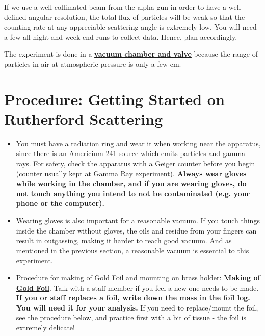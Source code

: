 \documentclass{../lab}
\begin{document}
If we use a well collimated beam from the alpha-gun in order to have a well defined angular resolution, the total flux of \textalpha{} particles will be weak so that the counting rate at any appreciable scattering angle is extremely low. You will need a few all-night and week-end runs to collect data. Hence, plan accordingly.

The experiment is done in a \href{https://berkeley-physics111b.github.io/assets/pdf/oldwebsitestructure/images/RUT\_Chamber.jpg}{\textbf{vacuum chamber and valve}} because the range of \textalpha{} particles in air at atmospheric pressure is only a few cm.

\section{Procedure: Getting Started on Rutherford Scattering}

\begin{itemize}
    \item You must have a radiation ring and wear it when working near the apparatus, since there is an Americium-241 source which emits \textalpha{} particles and gamma rays. For safety, check the apparatus with a Geiger counter before you begin (counter usually kept at Gamma Ray experiment). \textbf{Always wear gloves while working in the chamber, and if you are wearing gloves, do not touch anything you intend to not be contaminated (e.g. your phone or the computer).}

    \item Wearing gloves is also important for a reasonable vacuum. If you touch things inside the chamber without gloves, the oils and residue from your fingers can result in outgassing, making it harder to reach good vacuum. And as mentioned in the previous section, a reasonable vacuum is essential to this experiment.

    \item Procedure for making of Gold Foil and mounting on brass holder: \href{https://drive.google.com/file/d/1Uho1Ecl_7gig0CpwZg0Cfkx79GFoE9fm/view?usp=drive_link}{\textbf{Making of Gold Foil}}. Talk with a staff member if you feel a new one needs to be made. \textbf{If you or staff replaces a foil, write down the mass in the foil log. You will need it for your analysis.} If you need to replace/mount the foil, see the procedure below, and practice first with a bit of tissue - the foil is extremely delicate!

\end{itemize}
\end{document}
